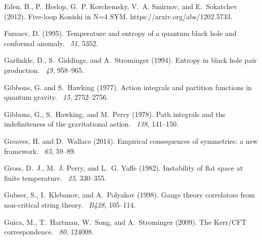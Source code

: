 \documentclass{article}
\begin{document}
\begin{thebibliography}{}
Eden, B., P.~Heslop, G.~P. Korchemsky, V.~A. Smirnov, and E.~Sokatchev (2012).
\newblock Five-loop {K}onishi in {N}=4 {SYM}.
\newblock https://arxiv.org/abs/1202.5733.

Fursaev, D. (1995).
\newblock Temperature and entropy of a quantum black hole and conformal
  anomaly.
~{\em 51}, 5352.

Garfinkle, D., S.~Giddings, and A.~Strominger (1994).
\newblock Entropy in black hole pair production.
~{\em 49}, 958--965.

Gibbons, G. and S.~Hawking (1977).
\newblock Action integrals and partition functions in quantum gravity.
~{\em 15}, 2752--2756.

Gibbons, G., S.~Hawking, and M.~Perry (1978).
\newblock Path integrals and the indefiniteness of the gravitational action.
~{\em 138}, 141--150.

Greaves, H. and D.~Wallace (2014).
\newblock Empirical consequences of symmetries: a new framework.
~{\em 65},
  59--89.

Gross, D.~J., M.~J. Perry, and L.~G. Yaffe (1982).
\newblock Instability of flat space at finite temperature.
~{\em 25}, 330--355.

Gubser, S., I.~Klebanov, and A.~Polyakov (1998).
\newblock Gauge theory correlators from non-critical string theory.
~{\em B428}, 105--114.

Guica, M., T.~Hartman, W.~Song, and A.~Strominger (2009).
\newblock The {K}err/{CFT} correspondence.
~{\em 80}, 124008.


\end{thebibliography}
\end{document}
